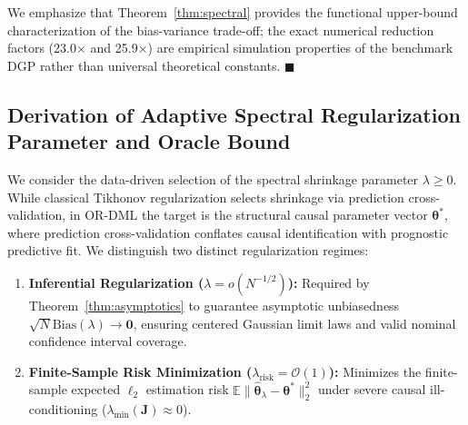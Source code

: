 \documentclass[twoside]{article}
\theoremstyle{definition}
\newcommand{\E}{\mathbb{E}}
\begin{document}
We emphasize that Theorem~\ref{thm:spectral} provides the functional upper-bound characterization of the bias-variance trade-off; the exact numerical reduction factors (23.0$\times$ and 25.9$\times$) are empirical simulation properties of the benchmark DGP rather than universal theoretical constants. $\blacksquare$

\subsection{Derivation of Adaptive Spectral Regularization Parameter and Oracle Bound}
\label{app:adaptive_lambda_derivation}
We consider the data-driven selection of the spectral shrinkage parameter $\lambda \ge 0$. While classical Tikhonov regularization selects shrinkage via prediction cross-validation, in OR-DML the target is the structural causal parameter vector $\boldsymbol{\theta}^*$, where prediction cross-validation conflates causal identification with prognostic predictive fit.
We distinguish two distinct regularization regimes:
\begin{enumerate}
    \item \textbf{Inferential Regularization ($\lambda = o(N^{-1/2})$):} Required by Theorem~\ref{thm:asymptotics} to guarantee asymptotic unbiasedness $\sqrt{N}\mathrm{Bias}(\lambda) \to \mathbf{0}$, ensuring centered Gaussian limit laws and valid nominal confidence interval coverage.
    \item \textbf{Finite-Sample Risk Minimization ($\lambda_{\mathrm{risk}} = \mathcal{O}(1)$):} Minimizes the finite-sample expected $\ell_2$ estimation risk $\E\|\hat{\boldsymbol{\theta}}_\lambda - \boldsymbol{\theta}^*\|_2^2$ under severe causal ill-conditioning ($\lambda_{\min}(\boldsymbol{J}) \approx 0$).
\end{enumerate}
\end{document}

